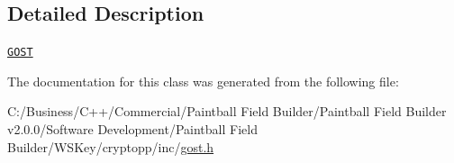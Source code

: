 \subsection{Detailed Description}
\href{http://www.weidai.com/scan-mirror/cs.html#GOST}{\tt GOST} 

The documentation for this class was generated from the following file:\begin{DoxyCompactItemize}
\item 
C:/Business/C++/Commercial/Paintball Field Builder/Paintball Field Builder v2.0.0/Software Development/Paintball Field Builder/WSKey/cryptopp/inc/\hyperlink{gost_8h}{gost.h}\end{DoxyCompactItemize}
